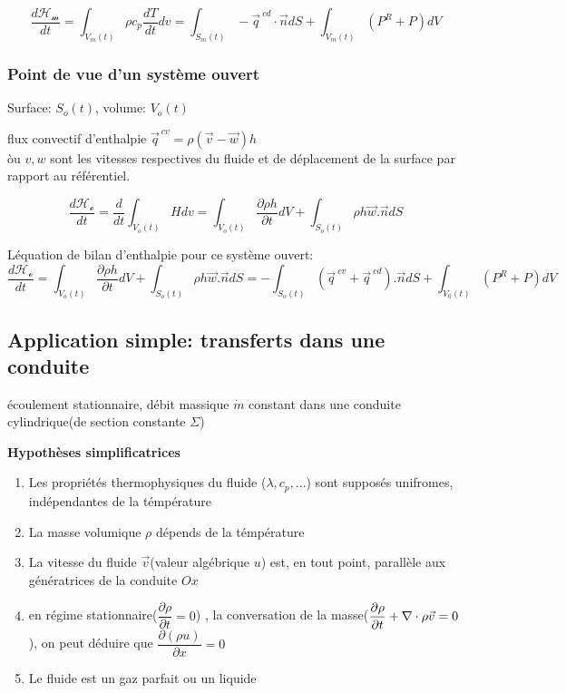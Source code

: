 \documentclass{article}
\begin{document}
\begin{equation}
\dfrac{d \mathcal{H_m}}{dt}
= \int_{V_m(t)} \rho c_p\frac{dT}{dt}dv
= \int_{S_m(t)} -\vec{q}^{\ cd} \cdot \vec{n}dS + \int_{V_m(t)} (P^{R} + P)dV
\end{equation}

\subsubsection{Point de vue d'un syst\`eme ouvert}
Surface: $S_o(t)$, volume: $V_o(t)$

flux convectif d'enthalpie $\vec{q}^{\ cv} = \rho(\vec{v} - \vec{w})h$\\
\`ou $v, w$ sont les vitesses respectives du fluide et de d\'eplacement de la surface par rapport au r\'ef\'erentiel.

$$
\dfrac{d\mathcal{H_o}}{dt}
= \dfrac{d}{dt} \int_{V_o(t)} Hdv
= \int_{V_o(t)} \frac{\partial \rho h}{\partial t}dV + \int_{S_o(t)} \rho h \vec{w} . \vec{n}dS
$$

L\'equation de bilan d'enthalpie pour ce syst\`eme ouvert:
$$
\dfrac{d\mathcal{H_o}}{dt}
= \int_{V_o(t)} \frac{\partial \rho h}{\partial t}dV + \int_{S_o(t)} \rho h \vec{w} . \vec{n}dS
= - \int_{S_o(t)} (\vec{q}^{\ cv} + \vec{q}^{\ cd}). \vec{n}dS + \int_{V_0(t)}(P^R + P )dV
$$

\subsection{Application simple: transferts dans une conduite}
\'ecoulement stationnaire, d\'ebit massique $\dot{m}$ constant dans une conduite cylindrique(de section constante $\Sigma$)

\textbf{Hypoth\`eses simplificatrices}\\
\begin{enumerate}
\item Les propri\'et\'es thermophysiques du fluide ($\lambda, c_p, \ldots$) sont suppos\'es unifromes, ind\'ependantes de la t\'emp\'erature
\item []La masse volumique $\rho$ d\'epends de la t\'emp\'erature
\item La vitesse du fluide $\vec{v}$(valeur alg\'ebrique $u$) est, en tout point, parall\`ele aux g\'en\'eratrices de la conduite $Ox$
\item []en r\'egime stationnaire($\dfrac{\partial \rho}{\partial t} = 0$) , la conversation de la masse($\dfrac{\partial \rho}{\partial t} + \nabla \cdot \rho \vec{v}=0$), on peut d\'eduire que $\dfrac{\partial (\rho u)}{\partial x} = 0$
\item Le fluide est un gaz parfait ou un liquide
\end{enumerate}
\end{document}
